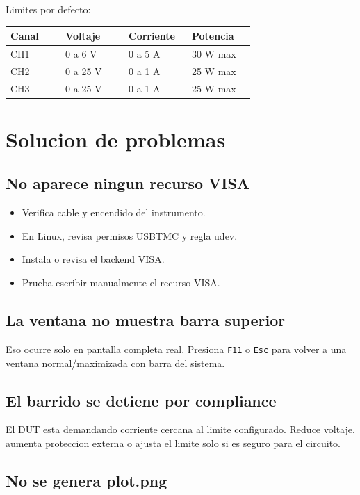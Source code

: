 \documentclass[11pt,letterpaper]{article}
\begin{document}
Limites por defecto:

\begin{longtable}{>{\raggedright\arraybackslash}p{0.20\linewidth}p{0.23\linewidth}p{0.23\linewidth}p{0.23\linewidth}}
\textbf{Canal} & \textbf{Voltaje} & \textbf{Corriente} & \textbf{Potencia} \\
\hline
CH1 & 0 a 6 V & 0 a 5 A & 30 W max \\
CH2 & 0 a 25 V & 0 a 1 A & 25 W max \\
CH3 & 0 a 25 V & 0 a 1 A & 25 W max \\
\end{longtable}

\section{Solucion de problemas}

\subsection{No aparece ningun recurso VISA}

\begin{itemize}
  \item Verifica cable y encendido del instrumento.
  \item En Linux, revisa permisos USBTMC y regla udev.
  \item Instala o revisa el backend VISA.
  \item Prueba escribir manualmente el recurso VISA.
\end{itemize}

\subsection{La ventana no muestra barra superior}

Eso ocurre solo en pantalla completa real. Presiona \texttt{F11} o \texttt{Esc}
para volver a una ventana normal/maximizada con barra del sistema.

\subsection{El barrido se detiene por compliance}

El DUT esta demandando corriente cercana al limite configurado. Reduce voltaje,
aumenta proteccion externa o ajusta el limite solo si es seguro para el circuito.

\subsection{No se genera plot.png}
\end{document}
